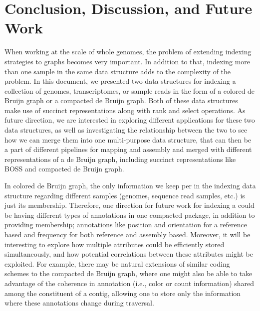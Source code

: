 \chapter{Conclusion, Discussion, and Future Work}

When working at the scale of whole genomes, the problem of extending indexing strategies to graphs becomes very important. In addition to that, indexing more than one sample in the same data structure adds to the complexity of the problem. In this document, we presented two data structures for indexing a collection of genomes, transcriptomes, or sample reads in the form of a colored de Bruijn graph or a compacted de Bruijn graph. Both of these data structures make use of succinct representations along with rank and select operations. As future direction, we are interested in exploring different applications for these two data structures, as well as investigating the relationship between the two to see how we can merge them into one multi-purpose data structure, that can then be a part of different pipelines for mapping and assembly and merged with different representations of a de Bruijn graph, including succinct representations like BOSS and compacted de Bruijn graph.

In colored de Bruijn graph, the only information we keep per \kmer in the indexing data structure regarding different samples (genomes, sequence read samples, etc.) is just its membership. Therefore, one direction for future work for indexing a \cdbg could be having different types of annotations in one compacted package, in addition to providing membership; annotations like position and orientation for a reference based \cdbg and frequency for both reference and assembly based. Moreover, it will be interesting to explore how multiple attributes could be efficiently stored simultaneously, and how potential correlations between these attributes might be exploited. For example, there may be natural extensions of similar coding schemes to the compacted de Bruijn graph, where one might also be able to take advantage of the coherence in annotation (i.e., color or count information) shared among the constituent \kmers of a contig, allowing one to store only the information where these annotations change during traversal.

